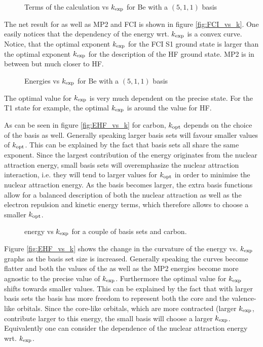 \begin{figure}
	\centering
	\caption{Terms of the \HF calculation vs $k_\text{exp}$ for Be with a $(5,1,1)$ \CS basis}
	\label{fig:EnergyTermsVsK}
\end{figure}

The net result for \HF as well as MP2 and FCI is shown in figure \vref{fig:FCI_vs_k}.
One easily notices that the dependency of the energy wrt. $k_\text{exp}$ is a
convex curve.
Notice, that the optimal exponent $k_\text{exp}$ for the FCI S1 ground state
is larger than the optimal exponent $k_\text{exp}$ for the description
of the HF ground state.
MP2 is in between but much closer to HF.

\begin{figure}
	\centering
	\caption{Energies vs $k_\text{exp}$ for Be with a $(5,1,1)$ \CS basis}
	\label{fig:FCI_vs_k}
\end{figure}

The optimal value for $k_\text{exp}$ is very much dependent on the
precise state.
For the T1 state for example, the optimal $k_\text{exp}$
is around the value for HF.

As can be seen in figure \vref{fig:EHF_vs_k}
for carbon,
$k_\text{opt}$ depends on the choice of the basis as well.
Generally speaking larger basis sets will favour
smaller values of $k_\text{opt}$.
This can be explained by the fact that \CS basis sets
all share the same exponent.
Since the largest contribution of the \HF energy
originates from the nuclear attraction energy,
small basis sets will overemphasize
the nuclear attraction interaction,
i.e. they will tend to larger values for $k_\text{opt}$
in order to minimise the nuclear attraction energy.
As the basis becomes larger,
the extra basis functions allow for a balanced
description of both the nuclear attraction
as well as the electron repulsion
and kinetic energy terms,
which therefore allows to choose a smaller $k_\text{opt}$.

\begin{figure}
	\centering
	\caption{\HF energy vs $k_\text{exp}$ for a couple of basis sets and carbon.}
	\label{fig:EHF_vs_k}
\end{figure}
Figure \vref{fig:EHF_vs_k} shows the change in the curvature
of the energy vs. $k_\text{exp}$ graphs as the basis set size is increased.
Generally speaking the curves become flatter and both the values of the
\HF as well as the MP2 energies become more agnostic to the precise value of $k_\text{exp}$.
Furthermore the optimal value for $k_\text{exp}$ shifts towards smaller values.
This can be explained by the fact that with larger basis sets
the basis has more freedom to represent both the core and the valence-like orbitals.
Since the core-like orbitals, which are more contracted (larger $k_\text{exp}$, contribute
larger to this energy, the small basis will choose a larger $k_\text{exp}$.
Equivalently one can consider the dependence of the nuclear attraction
energy wrt. $k_\text{exp}$.

